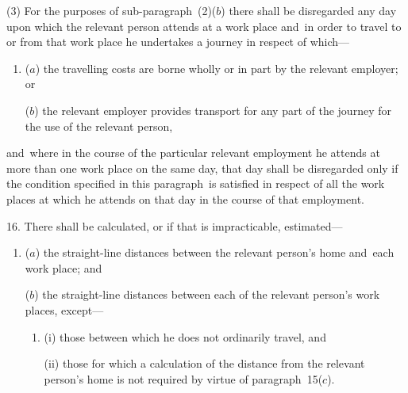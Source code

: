 \documentclass[12pt,a4paper]{article}
\begin{document}
(3) For the purposes of sub-paragraph~(2)($b$) there shall be disregarded any day upon which the relevant person attends at a work place and~in order to travel to or from that work place he undertakes a journey in respect of which—
\begin{enumerate}\item[]
($a$) the travelling costs are borne wholly or in part by the relevant employer; or

($b$) the relevant employer provides transport for any part of the journey for the use of the relevant person,
\end{enumerate}
and~where in the course of the particular relevant employment he attends at more than one work place on the same day, that day shall be disregarded only if the condition specified in this paragraph~is satisfied in respect of all the work places at which he attends on that day in the course of that employment.


\medskip

16.  There shall be calculated, or if that is impracticable, estimated—
\begin{enumerate}\item[]
($a$) the straight-line distances between the relevant person’s home and~each work place; and

($b$) the straight-line distances between each of the relevant person’s work places, except—
\begin{enumerate}\item[]
(i) those between which he does not ordinarily travel, and

(ii) those for which a calculation of the distance from the relevant person’s home is not required by virtue of paragraph~15($c$).
\end{enumerate}
\end{enumerate}

\medskip

\end{document}
